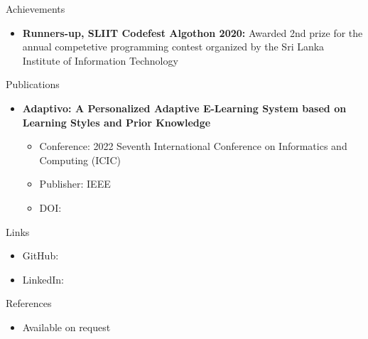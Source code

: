 \documentclass[garamond, a4paper]{modest-cv}
\begin{document}
	\begin{cvsection}{Achievements}
		\begin{cvsubsection}{}{}{}
			\begin{itemize}
				\item \textbf{Runners-up, SLIIT Codefest Algothon 2020:} Awarded 2nd prize for the annual competetive programming contest organized by the Sri Lanka Institute of Information Technology
			\end{itemize}
		\end{cvsubsection}
	\end{cvsection}

	\begin{cvsection}{Publications}
		\begin{cvsubsection}{}{}{}
			\begin{itemize}
				\item \textbf{Adaptivo: A Personalized Adaptive E-Learning System based on Learning Styles and Prior Knowledge}
				\begin{itemize}
					\item Conference: 2022 Seventh International Conference on Informatics and Computing (ICIC)
					\item Publisher: IEEE
					\item DOI: \ttfamily {}
				\end{itemize}
			\end{itemize}
		\end{cvsubsection}
	\end{cvsection}

	\begin{cvsection}{Links}
		\begin{cvsubsection}{}{}{}
			\begin{itemize}
				\item GitHub: \small {} \normalsize
				\item LinkedIn: \small {}
			\end{itemize}
		\end{cvsubsection}
	\end{cvsection}

	\begin{cvsection}{References}
		\begin{cvsubsection}{}{}{}
			\begin{itemize}
				\item Available on request
			\end{itemize}
		\end{cvsubsection}
	\end{cvsection}
\end{document}
